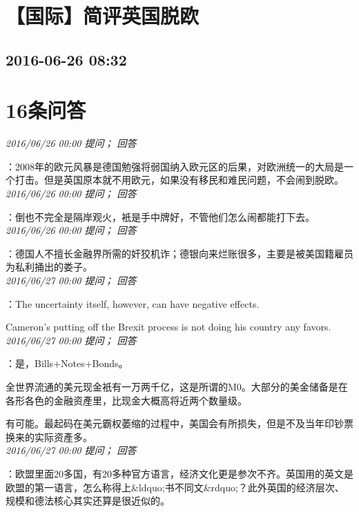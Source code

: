 \documentclass[twocolumn]{ctexart}
\begin{document}
\section{【国际】简评英国脱欧}
\subsection{2016-06-26 08:32}


\section{16条问答}

\textit{\hfill\noindent\small 2016/06/26 00:00 提问； 回答}

：2008年的欧元风暴是德国勉强将弱国纳入欧元区的后果，对欧洲统一的大局是一个打击。但是英国原本就不用欧元，如果没有移民和难民问题，不会闹到脱欧。\\

\textit{\hfill\noindent\small 2016/06/26 00:00 提问； 回答}

：倒也不完全是隔岸观火，衹是手中牌好，不管他们怎么闹都能打下去。\\

\textit{\hfill\noindent\small 2016/06/26 00:00 提问； 回答}

：德国人不擅长金融界所需的奸狡机诈；德银向来烂账很多，主要是被美国籍雇员为私利捅出的娄子。\\

\textit{\hfill\noindent\small 2016/06/27 00:00 提问； 回答}

：The uncertainty itself, however, can have negative effects.

Cameron's putting off the Brexit process is not doing his country any favors.\\

\textit{\hfill\noindent\small 2016/06/27 00:00 提问； 回答}

：是，Bills+Notes+Bonds。

全世界流通的美元现金衹有一万两千亿，这是所谓的M0。大部分的美金储备是在各形各色的金融资產里，比现金大概高将近两个数量级。

有可能。最起码在美元霸权萎缩的过程中，美国会有所损失，但是不及当年印钞票换来的实际资產多。\\

\textit{\hfill\noindent\small 2016/06/27 00:00 提问； 回答}

：欧盟里面20多国，有20多种官方语言，经济文化更是参次不齐。英国用的英文是欧盟的第一语言，怎么称得上\&ldquo;书不同文\&rdquo;？此外英国的经济层次、规模和德法核心其实还算是很近似的。
\end{document}
